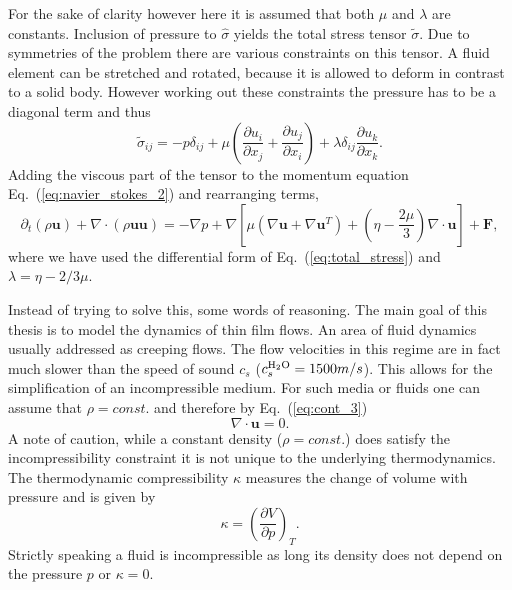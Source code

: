 For the sake of clarity however here it is assumed that both $\mu$ and $\lambda$ are constants.
Inclusion of pressure to $\hat{\sigma}$ yields the total stress tensor $\tilde{\sigma}$. 
Due to symmetries of the problem there are various constraints on this tensor.
A fluid element can be stretched and rotated, because it is allowed to deform in contrast to a solid body.
However working out these constraints the pressure has to be a diagonal term and thus
\begin{equation}\label{eq:total_stress}
    \tilde{\sigma}_{ij} = - p \delta_{ij} + \mu\left(\frac{\partial u_i}{\partial x_j} + \frac{\partial u_j}{\partial x_i}\right) + \lambda\delta_{ij}\frac{\partial u_k}{\partial x_k}.
\end{equation}
Adding the viscous part of the tensor to the momentum equation Eq.~(\ref{eq:navier_stokes_2}) and rearranging terms,
\begin{equation}\label{eq:navier_stokes_3}
    \partial_t(\rho\mathbf{u}) + \nabla\cdot(\rho\mathbf{u}\mathbf{u}) = - \nabla p + \nabla\left[\mu(\nabla\mathbf{u} + \nabla\mathbf{u}^T) + \left(\eta-\frac{2\mu}{3}\right)\nabla\cdot\mathbf{u}\right] + \textbf{F},
\end{equation}
where we have used the differential form of Eq.~(\ref{eq:total_stress}) and $\lambda = \eta - 2/3\mu$.

Instead of trying to solve this, some words of reasoning.
The main goal of this thesis is to model the dynamics of thin film flows.
An area of fluid dynamics usually addressed as creeping flows. 
The flow velocities in this regime are in fact much slower than the speed of sound $c_s$ ($c_s^{\ce{H2O}} = 1500m/s $). 
This allows for the simplification of an incompressible medium.
For such media or fluids one can assume that $\rho = const.$ and therefore by Eq.~(\ref{eq:cont_3}) 
\begin{equation}\label{eq:incomp}
    \nabla\cdot\mathbf{u} = 0.
\end{equation}
A note of caution, while a constant density ($\rho = const.$) does satisfy the incompressibility constraint it is not unique to the underlying thermodynamics.
The thermodynamic compressibility $\kappa$ measures the change of volume with pressure and is given by 
\begin{equation}
    \kappa = \left(\frac{\partial V}{\partial p}\right)_T.
\end{equation}
Strictly speaking a fluid is incompressible as long its density does not depend on the pressure $p$ or $\kappa = 0$.


